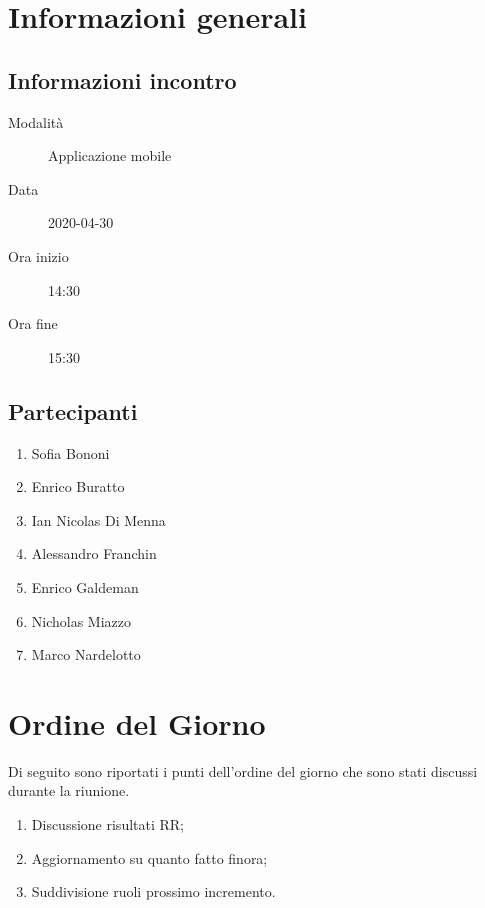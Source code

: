 \documentclass{article}
\begin{document}


\section{Informazioni generali}%
\label{sec:informazioni_generali}

\subsection{Informazioni incontro}%
\label{sub:informazioni_incontro}

\begin{description}
  \item[Modalità] Applicazione mobile 
  \item[Data] 2020-04-30
  \item[Ora inizio] 14:30
  \item[Ora fine] 15:30
\end{description}

\subsection{Partecipanti}%
\label{sub:partecipanti}

\begin{enumerate}
  \item Sofia Bononi
  \item Enrico Buratto
  \item Ian Nicolas Di Menna
  \item Alessandro Franchin
  \item Enrico Galdeman
  \item Nicholas Miazzo
  \item Marco Nardelotto
\end{enumerate}

\section{Ordine del Giorno}%
\label{ordine_del_giorno}
Di seguito sono riportati i punti dell'ordine del giorno che sono stati discussi durante la riunione.
\begin{enumerate}
  \item Discussione risultati RR;
  \item Aggiornamento su quanto fatto finora;
  \item Suddivisione ruoli prossimo incremento.
\end{enumerate}
\end{document}
